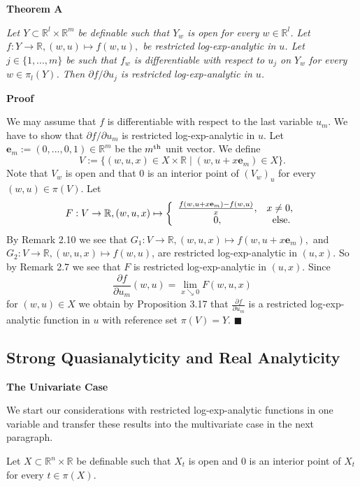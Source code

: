 \documentclass[12pt]{article}
\def\vs{\vspace}
\begin{document}
\vs{0.4cm}
{\bf Theorem A}

\vs{0.1cm}
{\it Let $Y \subset \mathbb{R}^l \times \mathbb{R}^m$ be definable such that $Y_w$ is open for every $w \in \mathbb{R}^l$. Let $f:Y \to \mathbb{R}, (w,u) \mapsto f(w,u),$ be restricted log-exp-analytic in $u$. Let $j \in \{1,...,m\}$ be such that $f_w$ is differentiable with respect to $u_j$ on $Y_w$ for every $w \in \pi_l(Y)$. Then $\partial f/\partial u_j$ is restricted log-exp-analytic in $u$.}

\vs{0.3cm}
{\bf Proof}

\vs{0.1cm}
We may assume that $f$ is differentiable with respect to the last variable $u_m$. We have to show that $\partial f/\partial u_m$ is restricted log-exp-analytic in $u$. Let $\textbf{e}_m:=(0,...,0,1) \in \mathbb{R}^m$ be the $m^{\textnormal{th}}$ unit vector. We define
$$V:=\{(w,u,x) \in X \times \mathbb{R} \mid (w,u+x\textbf{e}_m) \in X\}.$$
Note that $V_w$ is open and that $0$ is an interior point of $(V_w)_u$ for every $(w,u) \in \pi(V)$. Let
$$F:V \to \mathbb{R}, (w,u,x) \mapsto \left\{\begin{array}{cc}
 \frac{f(w,u+x\textbf{e}_m)-f(w,u)}{x}, & x \neq 0,\\
0, & \textnormal{ else}. \end{array}\right.$$
By Remark 2.10 we see that $G_1:V \to \mathbb{R}, (w,u,x) \mapsto f(w,u+x\textbf{e}_m),$ and $G_2:V \to \mathbb{R}, (w,u,x) \mapsto f(w,u)$, are restricted log-exp-analytic in $(u,x)$. So by Remark 2.7 we see that $F$ is restricted log-exp-analytic in $(u,x)$. Since
$$\frac{\partial f}{\partial u_m}(w,u)=\lim_{x \searrow 0}F(w,u,x)$$
for $(w,u) \in X$ we obtain by Proposition 3.17 that $\frac{\partial f}{\partial u_m}$ is a restricted log-exp-analytic function in $u$ with reference set $\pi(V)=Y$. \hfill$\blacksquare$

\subsection{Strong Quasianalyticity and Real Analyticity}

\vs{0.2cm}
{\bf The Univariate Case}

\vs{0.1cm}
We start our considerations with restricted log-exp-analytic functions in one variable and transfer these results into the multivariate case in the next paragraph.

\vs{0.2cm}
Let $X \subset \mathbb{R}^n \times \mathbb{R}$ be definable such that $X_t$ is open and $0$ is an interior point of $X_t$ for every $t \in \pi(X)$.
 
\end{document}
